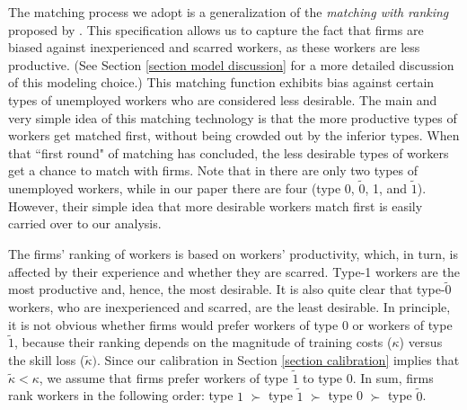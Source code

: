 \documentclass[12pt]{article} %
\theoremstyle{definition}
\begin{document}
The matching process we adopt is a generalization of the \cite{blanchard1994ranking} \textit{matching with ranking} proposed by \cite{petrongolo2001looking}. 
This specification allows us to capture the fact that firms are biased against inexperienced and scarred workers, as these workers are less productive. (See Section \ref{section model discussion} for a more detailed discussion of this modeling choice.) This matching function exhibits bias against certain types of unemployed workers who are considered less desirable. The main and very simple idea of this matching technology is that the more productive types of workers get matched first, without being crowded out by the inferior types. When that ``first round" of matching has concluded, the less desirable types of workers get a chance to match with firms. Note that in \cite{petrongolo2001looking} there are only two types of unemployed workers, while in our paper there are four (type 0, $\tilde{0}$, 1, and $\tilde{1}$). However, their simple idea that more desirable workers match first is easily carried over to our analysis. 



The firms' ranking of workers is based on workers' productivity, which, in turn, is affected by their experience and whether they are scarred. Type-1 workers are the most productive and, hence, the most desirable. It is also quite clear that type-$\tilde{0}$ workers, who are inexperienced and scarred, are the least desirable. In principle, it is not obvious whether firms would prefer workers of type 0 or workers of type $\tilde{1}$, because their ranking depends on the magnitude of training costs ($\kappa$) versus the skill loss ($\tilde{\kappa})$. Since our calibration in Section \ref{section calibration} implies that $\tilde{\kappa}< \kappa$, we assume that firms prefer workers of type $\tilde{1}$ to type $0$. In sum, firms rank workers in the following order: type $1$ $\succ$  type $\tilde{1}$ $\succ$ type 0 $\succ$  type $\tilde{0}$. 
\end{document}
